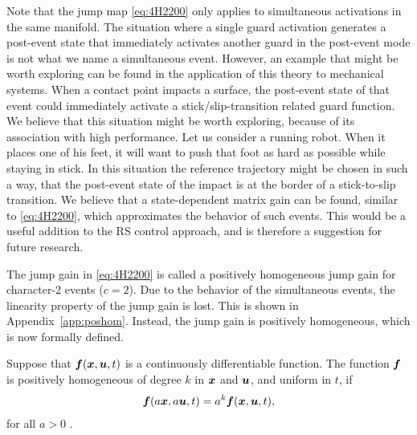 \documentclass[../DC2019003Bouma.tex]{subfiles}
\begin{document}
\begin{sloppypar}
\begin{myremark}
Note that the jump map \eqref{eq:4H2200} only applies to simultaneous activations in the same manifold. The situation where a single guard activation generates a post-event state that immediately activates another guard in the post-event mode is not what we name a simultaneous event. However, an example that might be worth exploring can be found in the application of this theory to mechanical systems. When a contact point impacts a surface, the post-event state of that event could immediately activate a stick/slip-transition related guard function. We believe that this situation might be worth exploring, because of its association with high performance. Let us consider a running robot. When it places one of his feet, it will want to push that foot as hard as possible while staying in stick. In this situation the reference trajectory might be chosen in such a way, that the post-event state of the impact is at the border of a stick-to-slip transition. We believe that a state-dependent matrix gain can be found, similar to \eqref{eq:4H2200}, which approximates the behavior of such events. This would be a useful addition to the RS control approach, and is therefore a suggestion for future research.
\end{myremark}
\end{sloppypar}

The jump gain in \eqref{eq:4H2200} is called a positively homogeneous jump gain for character-2 events ($c=2$). Due to the behavior of the simultaneous events, the linearity property of the jump gain is lost. This is shown in Appendix~\ref{app:poshom}. Instead, the jump gain is positively homogeneous, which is now formally defined.
 
\begin{sloppypar}
\begin{mydef}
Suppose that ${\boldsymbol{f}}({\boldsymbol{x}},{\boldsymbol{u}},t)$ is a continuously differentiable function. The function ${\boldsymbol{f}}$ is positively homogeneous of degree $k$ in ${\boldsymbol{x}}$ and ${\boldsymbol{u}}$, and uniform in $t$, if 
\begin{align}
{\boldsymbol{f}}(a{\boldsymbol{x}},a{\boldsymbol{u}},t) = a^k{\boldsymbol{f}}({\boldsymbol{x}},{\boldsymbol{u}},t),
\end{align}
for all $a>0$ \textnormal{\cite{Apostol1967}}.
\end{mydef}
\end{sloppypar}
\end{document}
